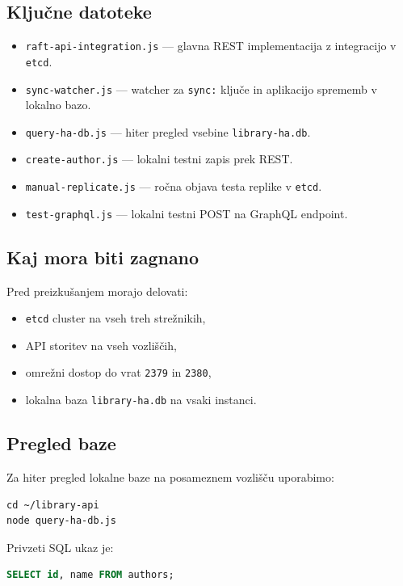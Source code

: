 \documentclass[a4paper,11pt]{article}
\begin{document}
\subsection{Ključne datoteke}
\begin{itemize}
  \item \texttt{raft-api-integration.js} --- glavna REST implementacija z integracijo v \texttt{etcd}.
  \item \texttt{sync-watcher.js} --- watcher za \texttt{sync:} ključe in aplikacijo sprememb v lokalno bazo.
  \item \texttt{query-ha-db.js} --- hiter pregled vsebine \texttt{library-ha.db}.
  \item \texttt{create-author.js} --- lokalni testni zapis prek REST.
  \item \texttt{manual-replicate.js} --- ročna objava testa replike v \texttt{etcd}.
  \item \texttt{test-graphql.js} --- lokalni testni POST na GraphQL endpoint.
\end{itemize}

\subsection{Kaj mora biti zagnano}
Pred preizkušanjem morajo delovati:
\begin{itemize}
  \item \texttt{etcd} cluster na vseh treh strežnikih,
  \item API storitev na vseh vozliščih,
  \item omrežni dostop do vrat \texttt{2379} in \texttt{2380},
  \item lokalna baza \texttt{library-ha.db} na vsaki instanci.
\end{itemize}

\subsection{Pregled baze}
Za hiter pregled lokalne baze na posameznem vozlišču uporabimo:

\begin{lstlisting}
cd ~/library-api
node query-ha-db.js
\end{lstlisting}

Privzeti SQL ukaz je:

\begin{lstlisting}[language=SQL]
SELECT id, name FROM authors;
\end{lstlisting}
\end{document}
